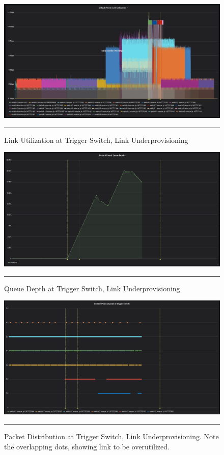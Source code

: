 \begin{figure}[htbp]
	\centering
		\includegraphics[width=1.0\columnwidth]{Figures/link_utilization_under.png}
		\rule{35em}{0.5pt}
	\caption[Link Utilization at Trigger Switch, Link Underprovisioning]{Link Utilization at Trigger Switch, Link Underprovisioning}
	\label{fig:link_utilization_under}
\end{figure}
\begin{figure}[htbp]
	\centering
		\includegraphics[width=1.0\columnwidth]{Figures/queue_depth_under.png}
		\rule{35em}{0.5pt}
	\caption[Queue Depth at Trigger Switch, Link Underprovisioning]{Queue Depth at Trigger Switch, Link Underprovisioning}
	\label{fig:queue_depth_under}
\end{figure}
\begin{figure}[htbp]
	\centering
		\includegraphics[width=1.0\columnwidth]{Figures/distribution_under.png}
		\rule{35em}{0.5pt}
	\caption[Packet Distribution at Trigger Switch, Link Underprovisioning]{Packet Distribution at Trigger Switch, Link Underprovisioning. Note the overlapping dots, showing link to be overutilized.}
	\label{fig:distribution_under}
\end{figure}
